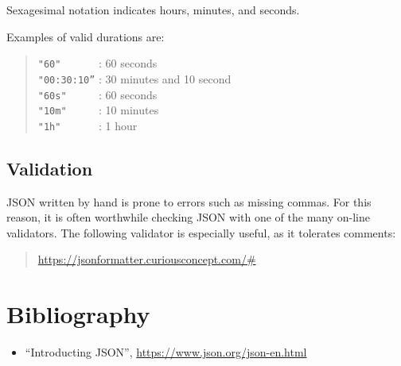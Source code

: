 Sexagesimal notation indicates hours, minutes, and seconds.

Examples of valid durations are:
\begin{quote}
\verb|"60"      | :	60 seconds\\
\verb|"00:30:10”| : 30 minutes and 10 second\\
\verb|"60s"		| :	60 seconds\\
\verb|"10m"		| :	10 minutes\\
\verb|"1h"		| :	1 hour
\end{quote}

\subsection{Validation}

JSON written by hand is prone to errors such as missing commas. For this reason, it is often worthwhile checking JSON with one of the many on-line validators. The following validator is especially useful, as it tolerates comments:

\begin{quote}
\url{https://jsonformatter.curiousconcept.com/#}
\end{quote}

\section{Bibliography}

\begin{itemize}
    \item “Introducting JSON”, \url{https://www.json.org/json-en.html}
\end{itemize}